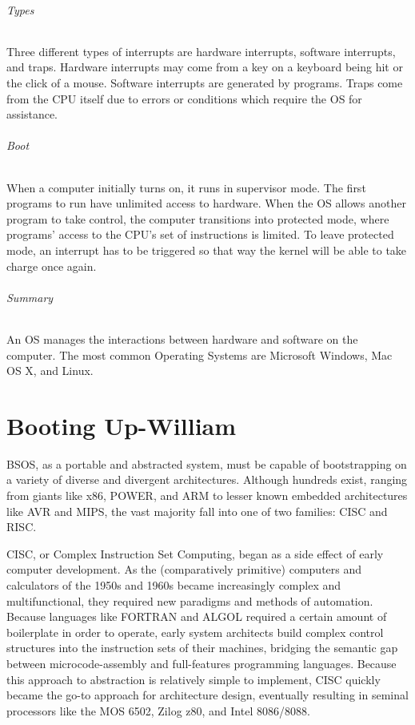 \documentclass[english]{article}
\begin{document}
\paragraph{Types}
Three different types of interrupts are hardware interrupts, software interrupts, and traps. Hardware interrupts may come from a key on a keyboard being hit or the click of a mouse. Software interrupts are generated by programs. Traps come from the CPU itself due to errors or conditions which require the OS for assistance.

\paragraph{Boot}
When a computer initially turns on, it runs in supervisor mode. The first programs to run have unlimited access to hardware. When the OS allows another program to take control, the computer transitions into protected mode, where programs' access to the CPU's set of instructions is limited. To leave protected mode, an interrupt has to be triggered so that way the kernel will be able to take charge once again.

\paragraph{Summary}
An OS manages the interactions between hardware and software on the computer. The most common Operating Systems are Microsoft Windows, Mac OS X, and Linux.

\part{Booting Up-William}
BSOS, as a portable and abstracted system, must be capable of bootstrapping on a variety of diverse and divergent architectures. Although hundreds exist, ranging from giants like x86, POWER, and ARM to lesser known embedded architectures like AVR and MIPS, the vast majority fall into one of two families: CISC and RISC.

CISC, or Complex Instruction Set Computing, began as a side effect of early computer development. As the (comparatively primitive) computers and calculators of the 1950s and 1960s became increasingly complex and multifunctional, they required new paradigms and methods of automation. Because languages like FORTRAN and ALGOL required a certain amount of boilerplate in order to operate, early system architects build complex control structures into the instruction sets of their machines, bridging the semantic gap between microcode-assembly and full-features programming languages. Because this approach to abstraction is relatively simple to implement, CISC quickly became the go-to approach for architecture design, eventually resulting in seminal processors like the MOS 6502, Zilog z80, and Intel 8086/8088.
\end{document}
